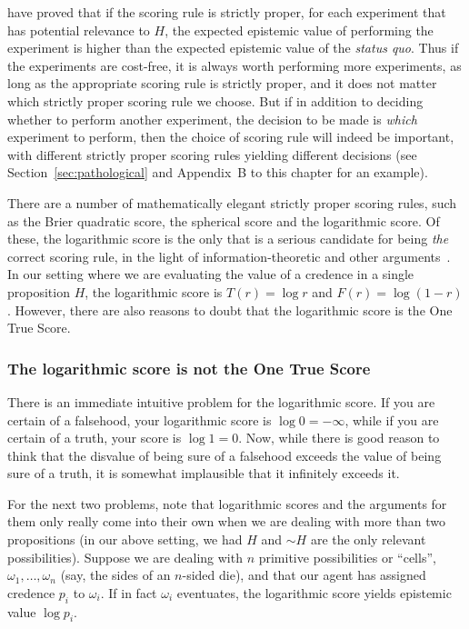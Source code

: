  have proved that if the scoring rule is strictly proper, for each experiment that has potential relevance 
to $H$, the expected epistemic value of performing the experiment is
higher than the expected epistemic value of the \textit{status quo}. Thus if the experiments are cost-free, it is
always worth performing more experiments, as long as the appropriate scoring rule is strictly proper,
and it does not matter which strictly proper scoring rule we choose. But if in addition to deciding whether to perform
another experiment, the decision to be made is \textit{which} experiment to perform, then the choice of scoring rule
will indeed be important, with different strictly proper scoring rules yielding different 
decisions (see Section~\ref{sec:pathological} and Appendix~B to this chapter for an example).

There are a number of mathematically elegant strictly proper scoring rules, such as the Brier quadratic score, the spherical score 
and the logarithmic score. Of these, the logarithmic score is the only that is a serious candidate for being \textit{the} correct
scoring rule, in the light of information-theoretic and other arguments~\cite{McCutcheonLog}. In our setting where we are
evaluating the value of a credence in a single proposition $H$, the logarithmic score is $T(r) = \log r$ and $F(r) = \log (1-r)$. 
However, there are also reasons to doubt that the logarithmic score is the One True Score. 

\subsubsection{The logarithmic score is not the One True Score}
There is an immediate intuitive problem for the logarithmic score. If you are certain of a falsehood, your logarithmic score is $\log 0 = -\infty$, while
if you are certain of a truth, your score is $\log 1 = 0$. Now, while there is good reason to think that the disvalue of being
sure of a falsehood exceeds the value of being sure of a truth, it is somewhat implausible that it infinitely exceeds it. 

For the next two problems, note that logarithmic scores and the arguments for them only really come into their own when we are 
dealing with more than two propositions (in our above setting, we had $H$ and $\sim H$ are the only relevant possibilities). Suppose 
we are dealing with $n$ primitive possibilities or ``cells'', $\omega_1,\dots,\omega_n$ (say, the sides of an $n$-sided die), and that our agent 
has assigned credence $p_i$ to $\omega_i$. If in fact $\omega_i$ eventuates, the logarithmic score yields epistemic value 
$\log p_i$. 

